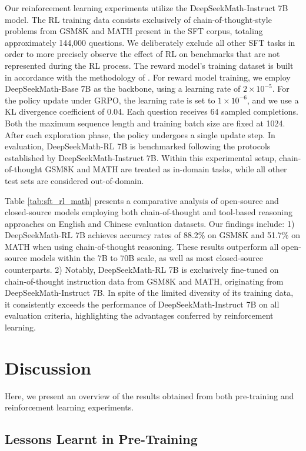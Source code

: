 \begin{itemize}[topsep=0pt]
\begin{itemize}[topsep=0pt]
Our reinforcement learning experiments utilize the DeepSeekMath-Instruct 7B model. The RL training data consists exclusively of chain-of-thought-style problems from GSM8K and MATH present in the SFT corpus, totaling approximately 144,000 questions. We deliberately exclude all other SFT tasks in order to more precisely observe the effect of RL on benchmarks that are not represented during the RL process. The reward model's training dataset is built in accordance with the methodology of \citep{wang2023math}. For reward model training, we employ DeepSeekMath-Base 7B as the backbone, using a learning rate of $2 \times 10^{-5}$. For the policy update under GRPO, the learning rate is set to $1 \times 10^{-6}$, and we use a KL divergence coefficient of 0.04. Each question receives $64$ sampled completions. Both the maximum sequence length and training batch size are fixed at 1024. After each exploration phase, the policy undergoes a single update step. In evaluation, DeepSeekMath-RL 7B is benchmarked following the protocols established by DeepSeekMath-Instruct 7B. Within this experimental setup, chain-of-thought GSM8K and MATH are treated as in-domain tasks, while all other test sets are considered out-of-domain.

Table \ref{tab:sft_rl_math} presents a comparative analysis of open-source and closed-source models employing both chain-of-thought and tool-based reasoning approaches on English and Chinese evaluation datasets. Our findings include: 1) DeepSeekMath-RL 7B achieves accuracy rates of 88.2\% on GSM8K and 51.7\% on MATH when using chain-of-thought reasoning. These results outperform all open-source models within the 7B to 70B scale, as well as most closed-source counterparts. 2) Notably, DeepSeekMath-RL 7B is exclusively fine-tuned on chain-of-thought instruction data from GSM8K and MATH, originating from DeepSeekMath-Instruct 7B. In spite of the limited diversity of its training data, it consistently exceeds the performance of DeepSeekMath-Instruct 7B on all evaluation criteria, highlighting the advantages conferred by reinforcement learning.

\section{Discussion}
Here, we present an overview of the results obtained from both pre-training and reinforcement learning experiments.

\subsection{Lessons Learnt in Pre-Training}


\end{itemize}
\end{itemize}
